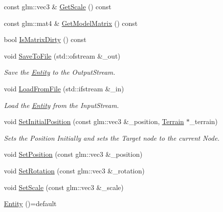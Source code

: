 \begin{DoxyCompactItemize}
\item 
const glm\+::vec3 \& \mbox{\hyperlink{classpiolot_1_1_entity_ac5530a0639da344c0e8f86c2176fa4a6}{Get\+Scale}} () const
\item 
const glm\+::mat4 \& \mbox{\hyperlink{classpiolot_1_1_entity_a6b0a54f38fa54989ad1c237d40fabcb0}{Get\+Model\+Matrix}} () const
\item 
bool \mbox{\hyperlink{classpiolot_1_1_entity_a025d60f0f6de447381d9ab2211986075}{Is\+Matrix\+Dirty}} () const
\item 
void \mbox{\hyperlink{classpiolot_1_1_entity_aefccda157de60277a141d865982a089b}{Save\+To\+File}} (std\+::ofstream \&\+\_\+out)
\begin{DoxyCompactList}\small\item\em Save the \mbox{\hyperlink{classpiolot_1_1_entity}{Entity}} to the Output\+Stream. \end{DoxyCompactList}\item 
void \mbox{\hyperlink{classpiolot_1_1_entity_a9906217e32eb3550d57fa526ed7fe60f}{Load\+From\+File}} (std\+::ifstream \&\+\_\+in)
\begin{DoxyCompactList}\small\item\em Load the \mbox{\hyperlink{classpiolot_1_1_entity}{Entity}} from the Input\+Stream. \end{DoxyCompactList}\item 
void \mbox{\hyperlink{classpiolot_1_1_entity_a4084ce43ed70e5a9ec1f51d811cdcead}{Set\+Initial\+Position}} (const glm\+::vec3 \&\+\_\+position, \mbox{\hyperlink{classpiolot_1_1_terrain}{Terrain}} $\ast$\+\_\+terrain)
\begin{DoxyCompactList}\small\item\em Sets the Position Initially and sets the Target node to the current Node. \end{DoxyCompactList}\item 
void \mbox{\hyperlink{classpiolot_1_1_entity_af80fc92eb9232113046c602d5daa1a76}{Set\+Position}} (const glm\+::vec3 \&\+\_\+position)
\item 
void \mbox{\hyperlink{classpiolot_1_1_entity_ae2d789ed80e63f1bcad90d003ea15e94}{Set\+Rotation}} (const glm\+::vec3 \&\+\_\+rotation)
\item 
void \mbox{\hyperlink{classpiolot_1_1_entity_a16d7b329d92ebdc78178e460c7cee6dc}{Set\+Scale}} (const glm\+::vec3 \&\+\_\+scale)
\item 
\mbox{\hyperlink{classpiolot_1_1_entity_af79da1eeca5dbb28414ca7e54e6c6d42}{Entity}} ()=default
\item 

\end{DoxyCompactItemize}
